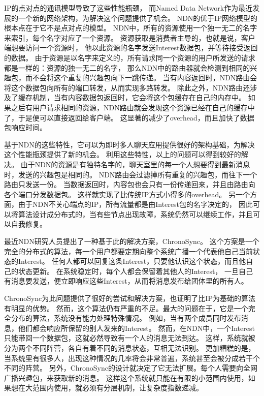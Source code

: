 \documentclass[a4paper]{article}
\begin{document}
IP的点对点的通讯模型导致了这些性能瓶颈，
而Named Data Network作为最近发展的一个新的网络架构，为解决这个问题提供了机会。
NDN的优于IP网络模型的根本点在于它不是点对点的模型。
NDN中，所有的资源使用一个独一无二的名字来索引，每个名字对应了一个资源。
资源获取是消费者主导的，也就是说，客户端想要访问一个资源时，
他以此资源的名字发送Interest数据包，并等待接受返回的数据。
由于资源是以名字来定义的，所有请求同一个资源的用户所发送的请求都是一样的：资源的独一无二的名字，
那么NDN中的路由器就会检测到相同的兴趣包，而不会将这个重复的兴趣包向下一跳传递。
当有内容返回时，NDN路由会将这个数据包向所有的端口转发，从而实现多路转发。
除此之外，NDN路由还涉及了缓存机制，当有内容数据包返回时，它会将这个包缓存在自己的内存中。
如果之后有用户请求相同的资源，NDN路由就会发现这个资源已经在自己的缓存中了，于是便可以直接返回给客户端。
这显著的减少了overhead，而且加快了数据包响应时间。

基于NDN的这些特性，它可以为即时多人聊天应用提供很好的架构基础，为解决这个性能瓶颈提供了新的机会。
利用这些特性，以上的问题可以得到较好的解决。
由于NDN的资源是有独特名字的，聊天室里的每一个人想要得到最新消息时，发送的兴趣包是相同的。
NDN路由会过滤掉所有重复的兴趣包，而往下一个路由只发送一份。
当数据返回时，内容包也会只有一份传递回来，并且由路由向各个端口分发数据包。
这样就实现了比传统IP方式小得多的overhead。
另一个方面，由于NDN不关心端点的IP，所有流量都是由Interest包的名字决定的，
因此可以将算法设计成分布式的，当有些节点出现故障，系统仍然可以继续工作，并且可以自我修复。

最近NDN研究人员提出了一种基于此的解决方案，ChronoSync。
这个方案是一个完全的分布式的算法，每一个用户都要定期向整个系统广播一个代表他自己当前状态的Interest。
任何人都可以回复这条Interest，只要他认识这个状态，而且他自己的状态更新。
在系统稳定时，每个人都会保留着其他人的Interest，
一旦自己有消息要发送，便立即响应这些Interest，从而将消息发布给团体里的所有人。

ChronoSync为此问题提供了很好的尝试和解决方案，也证明了比IP为基础的算法有明显的优势。
然而，这个算法仍有严重的不足。最大的问题在于，它是一个完全分布的算法，系统没有能力处理特殊情况。
例如，当有两个成员同时发布消息，他们都会响应所保留的别人发来的Interest。
然而，在NDN中，一个Interest只能带回一个数据包，这就必然导致有一个人的消息无法到达。
这样，系统就被分为两个不同阵营，各自有着不同的消息状态，互相无法识别。
更加糟糕的是，当系统里有很多人，出现这种情况的几率将会非常普遍，系统甚至会被分成若干个不同的阵营。
另外，ChronoSync的设计就决定了它无法扩展。每个人需要向全网广播兴趣包，来获取新的消息。
这样这个系统就只能在有限的小范围内使用，如果想在大范围内使用，就必须有分层机制，让复杂度指数递减。
\end{document}

